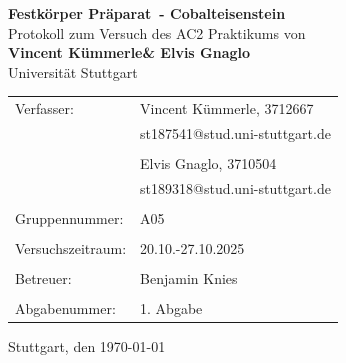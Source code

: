 \documentclass[a4paper,12pt,bibliography=totocnumbered]{scrartcl}
\makeatletter
\newcommand{\VERSUCHSDATUM}{20.10.-27.10.2025}
\newcommand{\PROTOKOLLDATUM}{\today}
\newcommand{\VerfasserEINS}{Vincent Kümmerle}
\newcommand{\MatNoEINS}{3712667}
\newcommand{\EmailEINS}{st187541@stud.uni-stuttgart.de}
\newcommand{\VerfasserZWEI}{Elvis Gnaglo}
\newcommand{\MatNoZWEI}{3710504}
\newcommand{\EmailZWEI}{st189318@stud.uni-stuttgart.de}
\newcommand{\BETREUER}{Benjamin Knies}
\newcommand{\GRUPPENNR}{A05}
\newcommand{\VERSUCHSNR}{Festkörper Präparat}
\newcommand{\VERSUCHSNAME}{Cobalteisenstein}
\makeatother
\begin{document}
\thispagestyle{empty}


\begin{titlepage}

\begin{center}
\Huge{\textbf{\VERSUCHSNR\ - \VERSUCHSNAME}}\\
\vspace{10mm}%
\Large{Protokoll zum Versuch des AC2 Praktikums von \\ \textbf{\VerfasserEINS\;\& \VerfasserZWEI}}\\
\vspace{10mm} 
\Large{Universität Stuttgart}\\
\end{center}
\vspace{1cm}
\begin{center}
\begin{tabular}{ll}
\large{Verfasser:}		& \large{\VerfasserEINS,} \large{\MatNoEINS} \\
 						& \large{\EmailEINS} \\
 						\vspace{0cm}\\
						& \large{\VerfasserZWEI,} \large{\MatNoZWEI} \\
                        & \large{\EmailZWEI} \\
						\vspace{0cm}\\
\large{Gruppennummer:}	& \large{\GRUPPENNR} \\
\vspace{0cm}\\
\large{Versuchszeitraum:}	& \large{\VERSUCHSDATUM} \\
\vspace{0cm}\\
\large{Betreuer:}		& \large{\BETREUER} \\
\vspace{0cm}\\
\large{Abgabenummer:} & \large{1. Abgabe}
\end{tabular}
\end{center}
\vspace{15mm}

\begin{center}
Stuttgart, den \PROTOKOLLDATUM
\end{center}

\end{titlepage}


\thispagestyle{empty}

\tableofcontents 
\end{document}
